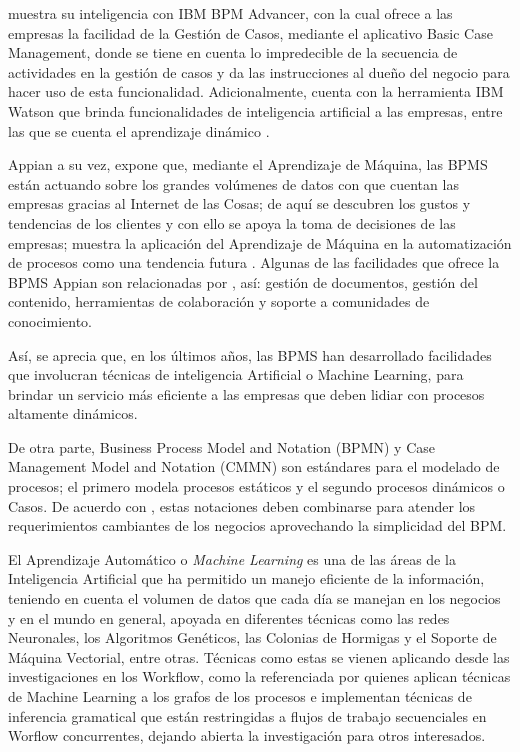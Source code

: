 \citet{IBMKnowledgeCenter2017} muestra su inteligencia con IBM BPM Advancer, con la cual ofrece a las empresas la facilidad de la Gestión de Casos, mediante el aplicativo Basic Case Management, donde se tiene en cuenta lo impredecible de la secuencia de actividades en la gestión de casos y da las instrucciones al dueño del negocio para hacer uso de esta funcionalidad. Adicionalmente, cuenta con la herramienta IBM Watson que brinda funcionalidades de inteligencia artificial a las empresas, entre las que se cuenta el aprendizaje dinámico \citep{IBMSaladePrensa2017}.

Appian a su vez, expone que, mediante el Aprendizaje de Máquina, las BPMS están actuando sobre los grandes volúmenes de datos con que cuentan las empresas gracias al Internet de las Cosas; de aquí se descubren los gustos y tendencias de los clientes y con ello se apoya la toma de decisiones de las empresas; muestra la aplicación del Aprendizaje de Máquina en la automatización de procesos como una tendencia futura \citep{Potrzeba2016}. Algunas de las facilidades que ofrece la BPMS Appian son relacionadas por \citet{AlarconMatta2007},  así: gestión de documentos, gestión del contenido, herramientas de colaboración y soporte a comunidades de conocimiento. 

Así, se aprecia que, en los últimos años, las BPMS han desarrollado facilidades que involucran técnicas de inteligencia Artificial o Machine Learning, para brindar un servicio más eficiente a las empresas que deben lidiar con procesos altamente dinámicos. 

De otra parte, Business Process Model and Notation (BPMN) y Case Management Model and Notation (CMMN) son estándares para el modelado de procesos; el primero modela procesos estáticos y el segundo procesos dinámicos o Casos. De acuerdo con \citet{auer2014business}, estas notaciones deben combinarse para atender los requerimientos cambiantes de los negocios aprovechando la simplicidad del BPM.

El Aprendizaje Automático o \textit{Machine Learning} es una de las áreas de la Inteligencia Artificial que ha permitido un manejo eficiente de la información, teniendo en cuenta el volumen de datos que cada día se manejan en los negocios y en el mundo en general, apoyada en diferentes técnicas como las redes Neuronales, los Algoritmos Genéticos, las Colonias de Hormigas y el Soporte de Máquina Vectorial, entre otras. Técnicas como estas se vienen aplicando desde las investigaciones en los Workflow, como la referenciada por \citet{herbst2000machine} quienes aplican técnicas de Machine Learning a los grafos de los procesos e implementan técnicas de inferencia gramatical que están restringidas a flujos de trabajo secuenciales en Worflow concurrentes, dejando abierta la investigación para otros interesados. 
